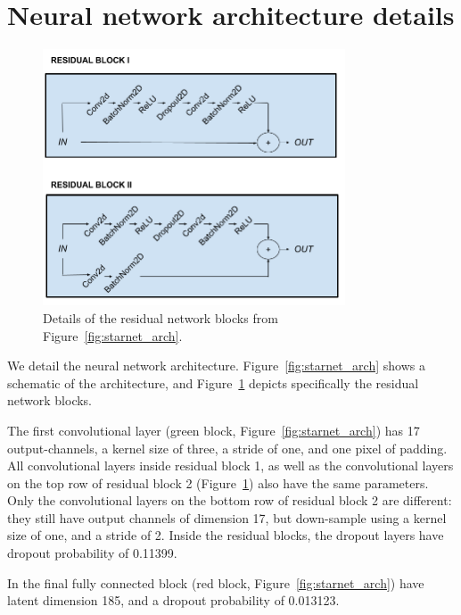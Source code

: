 \section{Neural network architecture details}
\label{sec:supp_nn_architecture}

\begin{figure}[!tb]
    \centering
    \includegraphics[width=0.8\textwidth]{figures/vi_figures/conv_block.png}
    \caption{Details of the residual network blocks from Figure~\ref{fig:starnet_arch}.
    }
    \label{fig:conv_blocks}
\end{figure}


We detail the neural network architecture. 
Figure~\ref{fig:starnet_arch} shows a schematic of the architecture, and 
Figure~\ref{fig:conv_blocks} depicts specifically 
the residual network blocks. 

The first convolutional layer (green block, Figure~\ref{fig:starnet_arch}) has 17 output-channels, a kernel size of three, a stride of one, and one pixel of padding.
All convolutional layers inside residual block 1, as well as the convolutional layers on the top row of residual block 2 (Figure~\ref{fig:conv_blocks}) also have the same parameters. 
Only the convolutional layers on the bottom row of residual block 2 are different: they still have output channels of dimension 17, 
but down-sample using a kernel size of one, and a stride of 2. 
Inside the residual blocks, the dropout layers have dropout probability of 0.11399. 

In the final fully connected block (red block, Figure~\ref{fig:starnet_arch}) have latent dimension 185, and a dropout probability of 0.013123. 

